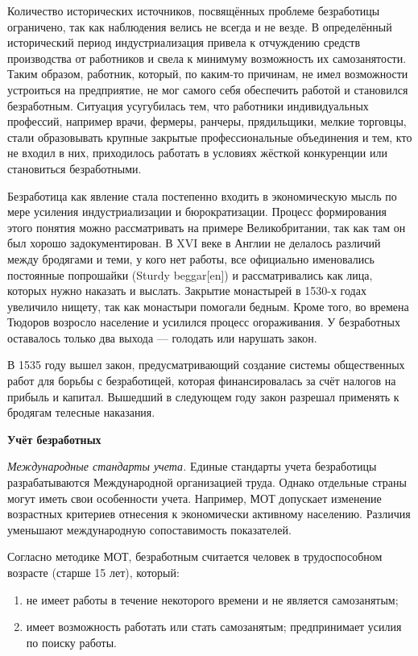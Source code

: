 Количество исторических источников, посвящённых проблеме безработицы ограничено, так как наблюдения велись не всегда и не везде. В определённый исторический период индустриализация привела к отчуждению средств производства от работников и свела к минимуму возможность их самозанятости. Таким образом, работник, который, по каким-то причинам, не имел возможности устроиться на предприятие, не мог самого себя обеспечить работой и становился безработным. Ситуация усугубилась тем, что работники индивидуальных профессий, например врачи, фермеры, ранчеры, прядильщики, мелкие торговцы, стали образовывать крупные закрытые профессиональные объединения и тем, кто не входил в них, приходилось работать в условиях жёсткой конкуренции или становиться безработными.

Безработица как явление стала постепенно входить в экономическую мысль по мере усиления индустриализации и бюрократизации. Процесс формирования этого понятия можно рассматривать на примере Великобритании, так как там он был хорошо задокументирован. В XVI веке в Англии не делалось различий между бродягами и теми, у кого нет работы, все официально именовались постоянные попрошайки (Sturdy beggar[en]) и рассматривались как лица, которых нужно наказать и выслать. Закрытие монастырей в 1530-х годах увеличило нищету, так как монастыри помогали бедным. Кроме того, во времена Тюдоров возросло население и усилился процесс огораживания. У безработных оставалось только два выхода — голодать или нарушать закон.

В 1535 году вышел закон, предусматривающий создание системы общественных работ для борьбы с безработицей, которая финансировалась за счёт налогов на прибыль и капитал. Вышедший в следующем году закон разрешал применять к бродягам телесные наказания.

\textbf{Учёт безработных}

\textit{Международные стандарты учета.}
Единые стандарты учета безработицы разрабатываются Международной организацией труда. Однако отдельные страны могут иметь свои особенности учета. Например, МОТ допускает изменение возрастных критериев отнесения к экономически активному населению. Различия уменьшают международную сопоставимость показателей.

Согласно методике МОТ, безработным считается человек в трудоспособном возрасте (старше 15 лет), который:
\begin{enumerate}
    \item не имеет работы в течение некоторого времени и не является самозанятым;
    \item имеет возможность работать или стать самозанятым;
          предпринимает усилия по поиску работы.
\end{enumerate}


